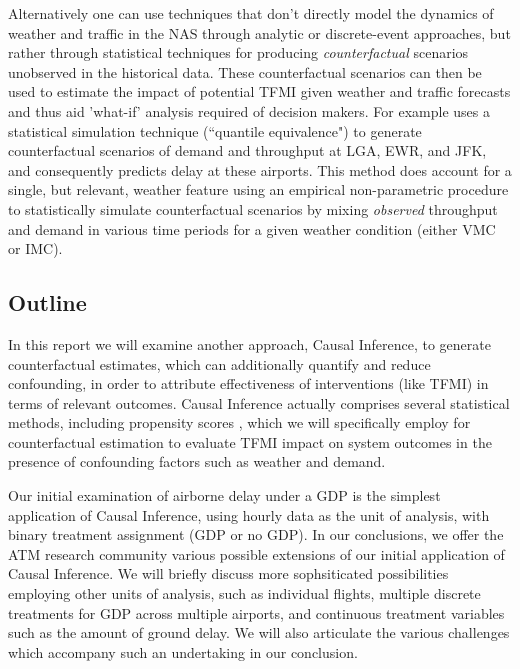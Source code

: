 \documentclass[conference]{IEEEtran}
\begin{document}

Alternatively one can use techniques that don't directly model the dynamics of weather and traffic in the NAS through analytic or discrete-event approaches, but rather through statistical techniques for producing \emph{counterfactual} scenarios unobserved in the historical data.  These counterfactual scenarios can then be used to estimate the impact of potential TFMI given weather and traffic forecasts and thus aid 'what-if' analysis required of decision makers.  For example \cite{kim2013} uses a statistical simulation technique (``quantile equivalence") to generate counterfactual scenarios of demand and throughput at LGA, EWR, and JFK, and consequently predicts delay at these airports.  This method does account for a single, but relevant, weather feature using an empirical non-parametric procedure to statistically simulate counterfactual scenarios by mixing \emph{observed} throughput and demand in various time periods for a given weather condition (either VMC or IMC).  


\subsection{Outline}
In this report we will examine another approach, Causal Inference, to generate counterfactual estimates, which can additionally quantify and reduce confounding, in order to attribute effectiveness of interventions (like TFMI) in terms of relevant outcomes. Causal Inference actually comprises several statistical methods, including propensity scores \cite{austin2011tutorial}, which we will specifically employ for counterfactual estimation to evaluate TFMI impact on system outcomes in the presence of confounding factors such as weather and demand.

Our initial examination of airborne delay under a GDP is the simplest application of Causal Inference, using hourly data as the unit of analysis, with binary treatment assignment (GDP or no GDP).  In our conclusions, we offer the ATM research community various possible extensions of our initial application of Causal Inference. We will briefly discuss more sophsiticated possibilities employing other units of analysis, such as individual flights, multiple discrete treatments for GDP across multiple airports, and continuous treatment variables such as the amount of ground delay.  We will also articulate the various challenges which accompany such an undertaking in our conclusion.  
\end{document}
